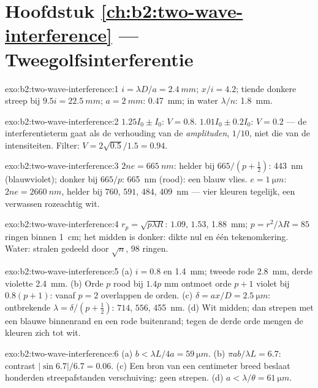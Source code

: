 \section*{Hoofdstuk \ref{ch:b2:two-wave-interference} --- Tweegolfsinterferentie}

\begin{solution}{exo:b2:two-wave-interference:1}
$i = \lambda D/a = \qty{2.4}{mm}$; $x/i = 4.2$; tiende donkere streep bij
$9.5i = \qty{22.5}{mm}$;
$a = \qty{2}{mm}$: \qty{0.47}{mm}; in water $\lambda/n$: \qty{1.8}{mm}.
\end{solution}

\begin{solution}{exo:b2:two-wave-interference:2}
$1.25I_0 \pm I_0$: $V = 0.8$. $1.01I_0 \pm 0.2I_0$: $V = 0.2$ --- de
interferentieterm
gaat als de verhouding van de \emph{amplituden}, $1/10$, niet die van de
intensiteiten. Filter:
$V = 2\sqrt{0.5}/1.5 = 0.94$.
\end{solution}

\begin{solution}{exo:b2:two-wave-interference:3}
$2ne = \qty{665}{nm}$: helder bij $665/(p + \tfrac12)$: \qty{443}{nm} (blauwviolet);
donker bij $665/p$: \qty{665}{nm} (rood): een blauw vlies.
$e = \qty{1}{\micro m}$: $2ne = \qty{2660}{nm}$,
helder bij $760$, $591$, $484$, \qty{409}{nm} --- vier kleuren tegelijk, een
verwassen rozeachtig wit.
\end{solution}

\begin{solution}{exo:b2:two-wave-interference:4}
$r_p = \sqrt{p\lambda R}$: $1.09$, $1.53$, \qty{1.88}{mm};
$p = r^2/\lambda R = 85$ ringen binnen
\qty{1}{cm}; het midden is donker: dikte nul en één tekenomkering. Water:
stralen gedeeld door $\sqrt n$, $98$ ringen.
\end{solution}

\begin{solution}{exo:b2:two-wave-interference:5}
(a) $i = 0.8$ en \qty{1.4}{mm}; tweede rode \qty{2.8}{mm}, derde violette
\qty{2.4}{mm}.
(b) Orde $p$ rood bij $1.4p$ mm ontmoet orde $p + 1$ violet bij $0.8(p + 1)$: vanaf
$p = 2$ overlappen de orden. (c) $\delta = ax/D = \qty{2.5}{\micro m}$:
ontbrekende $\lambda = \delta/(p +
\tfrac12)$: $714$, $556$, \qty{455}{nm}.
(d) Wit midden; dan strepen met een
blauwe binnenrand en een rode buitenrand; tegen de derde orde mengen de kleuren
zich tot wit.
\end{solution}

\begin{solution}{exo:b2:two-wave-interference:6}
(a) $b < \lambda L/4a = \qty{59}{\micro m}$. (b) $\pi ab/\lambda L = 6.7$:
contrast $|\sin6.7|/6.7
= 0.06$. (c) Een bron van een centimeter breed
beslaat honderden streepafstanden
verschuiving: geen strepen. (d) $a < \lambda/\theta = \qty{61}{\micro m}$.
\end{solution}

